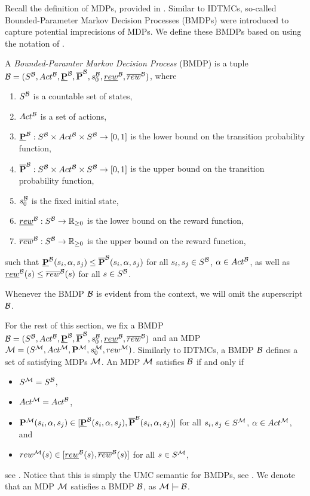 Recall the definition of MDPs, provided in . Similar to IDTMCs, so-called Bounded-Parameter Markov Decision Processes (BMDPs) were introduced to capture potential imprecisions of MDPs. We define these BMDPs based on \cite{Givan_Bounded_Parameter_MDP_discounted,Tewari_Bounded_Parameter_MDP} using the notation of \cite{Bibel}.

\begin{definition}
    A \textit{Bounded-Paramter Markov Decision Process} (BMDP) is a tuple \\$\mathcal{B} = (S^{\mathcal{B}},Act^{\mathcal{B}},\mathbf{\underline{P}}^{\mathcal{B}},\mathbf{\overline{P}}^{\mathcal{B}},s_0^{\mathcal{B}},\underline{rew}^{\mathcal{B}},\overline{rew}^{\mathcal{B}})$, where
    \begin{enumerate}[label=(\roman*)]
        \item $S^{\mathcal{B}}$ is a countable set of states,
        \item $Act^{\mathcal{B}}$ is a set of actions,
        \item $\mathbf{\underline{P}}^{\mathcal{B}}: S^{\mathcal{B}} \times Act^{\mathcal{B}} \times S^{\mathcal{B}} \rightarrow [0,1]$ is the lower bound on the transition probability function,
        \item $\mathbf{\overline{P}}^{\mathcal{B}}: S^{\mathcal{B}} \times Act^{\mathcal{B}} \times S^{\mathcal{B}} \rightarrow [0,1]$ is the upper bound on the transition probability function,
        \item $s_0^{\mathcal{B}}$ is the fixed initial state,
        \item $\underline{rew}^{\mathcal{B}}: S^{\mathcal{B}} \rightarrow\mathbb{R}_{\geq 0}$ is the lower bound on the reward function,
        \item $\overline{rew}^{\mathcal{B}}: S^{\mathcal{B}} \rightarrow\mathbb{R}_{\geq 0}$ is the upper bound on the reward function,
    \end{enumerate}
    such that $\mathbf{\underline{P}}^{\mathcal{B}}(s_i,\alpha,s_j) \leq \mathbf{\overline{P}}^{\mathcal{B}}(s_i,\alpha,s_j)$ for all $s_i,s_j\in S^{\mathcal{B}}$, $\alpha \in Act^{\mathcal{B}}$, as well as $\underline{rew}^{\mathcal{B}}(s) \leq \overline{rew}^{\mathcal{B}}(s)$ for all $s\in S^{\mathcal{B}}$.
\end{definition}
Whenever the BMDP $\mathcal{B}$ is evident from the context, we will omit the superscript $\mathcal{B}$.

For the rest of this section, we fix a BMDP $\mathcal{B} = (S^{\mathcal{B}},Act^{\mathcal{B}},\mathbf{\underline{P}}^{\mathcal{B}},\mathbf{\overline{P}}^{\mathcal{B}},s_0^{\mathcal{B}},\underline{rew}^{\mathcal{B}},\overline{rew}^{\mathcal{B}})$ and an MDP $\mathcal{M} = (S^{\mathcal{M}},Act^{\mathcal{M}},\mathbf{P}^{\mathcal{M}},s_0^{\mathcal{M}},rew^{\mathcal{M}})$.
Similarly to IDTMCs, a BMDP $\mathcal{B}$ defines a set of satisfying MDPs $\mathcal{M}$. An MDP $\mathcal{M}$ satisfies $\mathcal{B}$ if and only if 
\begin{itemize}
    \item $S^{\mathcal{M}} = S^{\mathcal{B}}$,
    \item $Act^{\mathcal{M}} = Act^{\mathcal{B}}$,
    \item $\mathbf{P}^{\mathcal{M}}(s_i,\alpha,s_j) \in [\mathbf{\underline{P}}^{\mathcal{B}}(s_i,\alpha,s_j),\mathbf{\overline{P}}^{\mathcal{B}}(s_i,\alpha,s_j)]$ for all $s_i,s_j\in S^{\mathcal{M}}$, $\alpha\in Act^{\mathcal{M}}$, and
    \item $rew^{\mathcal{M}}(s) \in [\underline{rew}^{\mathcal{B}}(s),\overline{rew}^{\mathcal{B}}(s)]$ for all $s\in S^{\mathcal{M}}$,
\end{itemize}
see \cite{Tewari_Bounded_Parameter_MDP}. Notice that this is simply the UMC semantic for BMDPs, see . We denote that an MDP $\mathcal{M}$ satisfies a BMDP $\mathcal{B}$, as $\mathcal{M} \models \mathcal{B}$.

